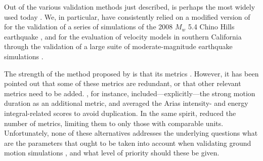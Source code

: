 Out of the various validation methods just described, \citet{Anderson_2004_Proc} is perhaps the most widely used today \citep[e.g.,][]{Chaljub_2010_BSSA, Bielak_2010_GJI, Guidotti_2011_SRL, Maufroy_2015_BSSA}. 
%
We, in particular, have consistently relied on a modified version of  for the validation of a series of simulations of the 2008 $M_w$ 5.4 Chino Hills earthquake \citep{Taborda_2013_BSSA, Taborda_2014_BSSA}, and for the evaluation of velocity models in southern California through the validation of a large suite of moderate-magnitude earthquake simulations \citep{Taborda_2016_GJI}.
%
%

The strength of the method proposed by \citet{Anderson_2004_Proc} is that its metrics . However, it has been pointed out that some of these metrics are redundant, or that other relevant metrics need to be added. \citet{Taborda_2013_BSSA}, for instance, included---explicitly---the strong motion duration \citep{Trifunac_1975_BSSA} as an additional metric, and averaged the Arias intensity- and energy integral-related scores to avoid duplication. In the same spirit, \citet{Maufroy_2015_BSSA} reduced the number of metrics, limiting them to only those with comparable units. Unfortunately, none of these alternatives addresses the underlying questions  what are the  parameters that ought to be taken into account when validating ground motion simulations , and what level of priority should these  be given.

